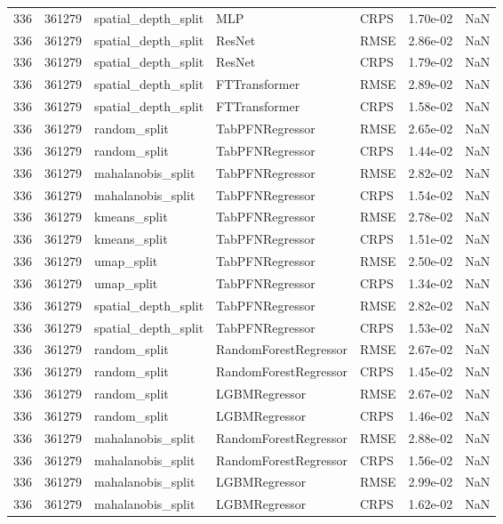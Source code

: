 \begin{tabular}{rrlllrr}
336 & 361279 & spatial\_depth\_split & MLP & CRPS & 1.70e-02 & NaN \\
336 & 361279 & spatial\_depth\_split & ResNet & RMSE & 2.86e-02 & NaN \\
336 & 361279 & spatial\_depth\_split & ResNet & CRPS & 1.79e-02 & NaN \\
336 & 361279 & spatial\_depth\_split & FTTransformer & RMSE & 2.89e-02 & NaN \\
336 & 361279 & spatial\_depth\_split & FTTransformer & CRPS & 1.58e-02 & NaN \\
336 & 361279 & random\_split & TabPFNRegressor & RMSE & 2.65e-02 & NaN \\
336 & 361279 & random\_split & TabPFNRegressor & CRPS & 1.44e-02 & NaN \\
336 & 361279 & mahalanobis\_split & TabPFNRegressor & RMSE & 2.82e-02 & NaN \\
336 & 361279 & mahalanobis\_split & TabPFNRegressor & CRPS & 1.54e-02 & NaN \\
336 & 361279 & kmeans\_split & TabPFNRegressor & RMSE & 2.78e-02 & NaN \\
336 & 361279 & kmeans\_split & TabPFNRegressor & CRPS & 1.51e-02 & NaN \\
336 & 361279 & umap\_split & TabPFNRegressor & RMSE & 2.50e-02 & NaN \\
336 & 361279 & umap\_split & TabPFNRegressor & CRPS & 1.34e-02 & NaN \\
336 & 361279 & spatial\_depth\_split & TabPFNRegressor & RMSE & 2.82e-02 & NaN \\
336 & 361279 & spatial\_depth\_split & TabPFNRegressor & CRPS & 1.53e-02 & NaN \\
336 & 361279 & random\_split & RandomForestRegressor & RMSE & 2.67e-02 & NaN \\
336 & 361279 & random\_split & RandomForestRegressor & CRPS & 1.45e-02 & NaN \\
336 & 361279 & random\_split & LGBMRegressor & RMSE & 2.67e-02 & NaN \\
336 & 361279 & random\_split & LGBMRegressor & CRPS & 1.46e-02 & NaN \\
336 & 361279 & mahalanobis\_split & RandomForestRegressor & RMSE & 2.88e-02 & NaN \\
336 & 361279 & mahalanobis\_split & RandomForestRegressor & CRPS & 1.56e-02 & NaN \\
336 & 361279 & mahalanobis\_split & LGBMRegressor & RMSE & 2.99e-02 & NaN \\
336 & 361279 & mahalanobis\_split & LGBMRegressor & CRPS & 1.62e-02 & NaN \\

\end{tabular}

